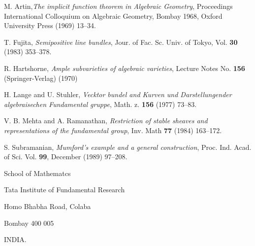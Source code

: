 \begin{thebibliography}{99}
 M. Artin,\textit{The implicit function theorem in  Algebraic Geometry}, Proceedings International Colloquium on Algebraic Geometry, Bombay 1968, Oxford University Press (1969) 13--34.

 T. Fujita, \textit{Semipositive line bundles}, Jour. of Fac. Sc. Univ. of Tokyo, Vol. {\bf 30} (1983) 353--378.

 R. Hartshorne, \textit{Ample subvarieties of algebraic varieties}, Lecture Notes No. {\bf 156} (Springer-Verlag) (1970)

 H. Lange and U. Stuhler, \textit{Vecktor bundel and Kurven und Darstellungender algebraisechen Fundamental gruppe}, Math. z. {\bf 156} (1977) 73--83.

 V. B. Mehta and A. Ramanathan, \textit{Restriction of stable sheaves and representations of the fundamental group}, Inv. Math {\bf 77} (1984) 163--172.

 S. Subramanian, \textit{Mumford's example and a general construction}, Proc. Ind. Acad. of Sci. Vol. {\bf 99}, December (1989) 97--208.
\end{thebibliography}

\bigskip

\begin{flushleft}
School of Mathematcs

Tata Institute of Fundamental Research

Homo Bhabha Road, Colaba

Bombay 400 005

INDIA.
\end{flushleft}
